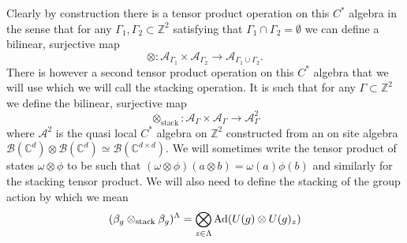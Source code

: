 \documentclass[12pt,a4paper,twoside]{article}
\let\originalleft\left
\let\originalright\right
\renewcommand{\left}{\mathopen{}\mathclose\bgroup\originalleft}
\renewcommand{\right}{\aftergroup\egroup\originalright}
\newcommand{\BB}{\mathcal B}
\newcommand{\ZZ}{\mathbb Z}
\newcommand{\CC}{\mathbb C}
\renewcommand{\AA}{\mathcal A}
\newcommand{\Ad}[1]{\textrm{Ad}\left(#1\right)}
\theoremstyle{definition}
\numberwithin{equation}{section}
\begin{document}
Clearly by construction there is a tensor product operation on this $C^*$ algebra in the sense that for any $\Gamma_1,\Gamma_2\subset\ZZ^2$ satisfying that $\Gamma_1\cap\Gamma_2=\emptyset$ we can define a bilinear, surjective map
\begin{equation}
	\otimes:\AA_{\Gamma_1}\times\AA_{\Gamma_2}\rightarrow \AA_{\Gamma_1\cup\Gamma_2}.
\end{equation}
There is however a second tensor product operation on this $C^*$ algebra that we will use which we will call the stacking operation. It is such that for any $\Gamma\subset\ZZ^2$ we define the bilinear, surjective map
\begin{equation}
	\otimes_{\text{stack}}:\AA_{\Gamma}\times\AA_{\Gamma}\rightarrow \AA^2_{\Gamma}
\end{equation}
where $\AA^2$ is the quasi local $C^*$ algebra on $\ZZ^2$ constructed from an on site algebra $\BB(\CC^d)\otimes\BB(\CC^d)\simeq \BB(\CC^{d\times d})$. We will sometimes write the tensor product of states $\omega\otimes\phi$ to be such that $(\omega\otimes\phi)(a\otimes b)=\omega(a)\phi(b)$ and similarly for the stacking tensor product. We will also need to define the stacking of the group action by which we mean
\begin{equation}
	(\beta_g\otimes_{\text{stack}}\beta_g)^\Lambda=\bigotimes_{z\in\Lambda}\Ad{U(g)\otimes U(g)_z}
\end{equation}
\end{document}
